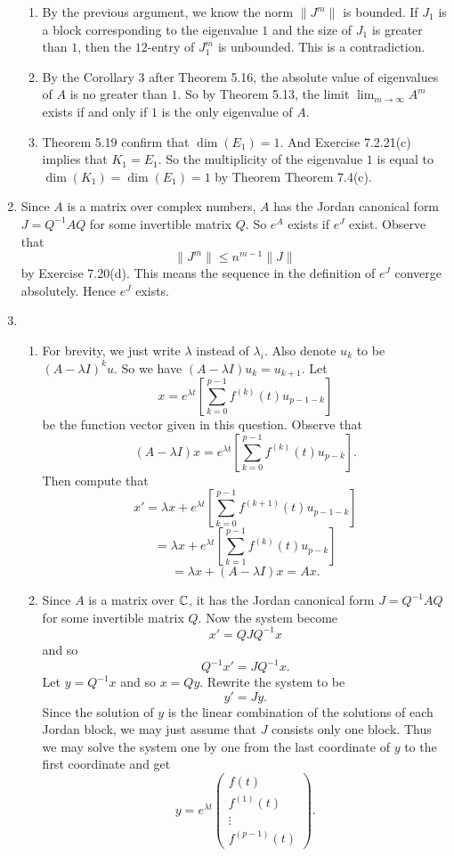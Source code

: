 \begin{enumerate}
\begin{enumerate}
\item By the previous argument, we know the norm $\|J^m\|$ is bounded. If $J_1$ is a block corresponding to the eigenvalue $1$ and the size of $J_1$ is greater than $1$, then the $12$-entry of $J_1^m$ is unbounded. This is a contradiction. 
\item By the Corollary 3 after Theorem 5.16, the absolute value of eigenvalues of $A$ is no greater than $1$. So by Theorem 5.13, the limit $\lim_{m\rightarrow \infty}A^m$ exists if and only if $1$ is the only eigenvalue of $A$.
\item Theorem 5.19 confirm that $\dim(E_1)=1$. And Exercise 7.2.21(c) implies that $K_1=E_1$. So the multiplicity of the eigenvalue $1$ is equal to $\dim(K_1)=\dim(E_1)=1$ by Theorem Theorem 7.4(c).
\end{enumerate}
\item Since $A$ is a matrix over complex numbers, $A$ has the Jordan canonical form $J=Q^{-1}AQ$ for some invertible matrix $Q$. So $e^A$ exists if $e^J$ exist. Observe that 
\[\|J^m\|\leq n^{m-1}\|J\|\]
by Exercise 7.20(d). This means the sequence in the definition of $e^J$ converge absolutely. Hence $e^J$ exists.
\item \begin{enumerate}
\item For brevity, we just write $\lambda$ instead of $\lambda_i$. Also denote $u_k$ to be $(A-\lambda I)^ku$. So we have $(A-\lambda I)u_k=u_{k+1}$. Let 
\[x=e^{\lambda t}[\sum_{k=0}^{p-1}f^{(k)}(t)u_{p-1-k}]\]
be the function vector given in this question. Observe that 
\[(A-\lambda I)x=e^{\lambda t}[\sum_{k=0}^{p-1}f^{(k)}(t)u_{p-k}].\]
Then compute that 
\[x'=\lambda x+e^{\lambda t}[\sum_{k=0}^{p-1}f^{(k+1)}(t)u_{p-1-k}]\]
\[=\lambda x+e^{\lambda t}[\sum_{k=1}^{p-1}f^{(k)}(t)u_{p-k}]\]
\[=\lambda x+(A-\lambda I)x=Ax.\]
\item Since $A$ is a matrix over $\mathbb{C}$, it has the Jordan canonical form $J=Q^{-1}AQ$ for some invertible matrix $Q$. Now the system become 
\[x'=QJQ^{-1}x\]
and so 
\[Q^{-1}x'=JQ^{-1}x.\]
Let $y=Q^{-1}x$ and so $x=Qy$. Rewrite the system to be 
\[y'=Jy.\]
Since the solution of $y$ is the linear combination of the solutions of each Jordan block, we may just assume that $J$ consists only one block. Thus we may solve the system one by one from the last coordinate of $y$ to the first coordinate and get 
\[y=e^{\lambda t}\begin{pmatrix}f(t)\\f^{(1)}(t)\\\vdots \\f^{(p-1)}(t)\end{pmatrix}.\]

\end{enumerate}
\end{enumerate}
